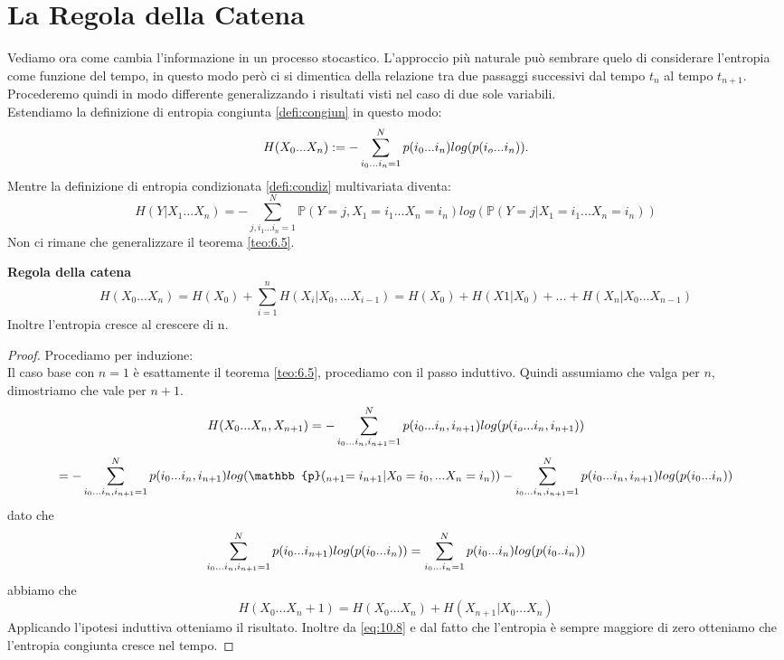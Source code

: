 \section{La Regola della Catena}
\label{sec:chainRule}
Vediamo ora come cambia l'informazione in un processo stocastico. L'approccio più naturale può sembrare quelo di considerare l'entropia come funzione del tempo, in questo modo però ci si dimentica della relazione tra due passaggi successivi dal tempo $t_n$ al tempo $t_{n+1}$. Procederemo quindi in modo differente generalizzando i risultati visti nel caso di due sole variabili.\\
 Estendiamo la definizione di entropia congiunta \ref{defi:congiun} in questo modo:
\begin{equation}
H(X_0...X_n):=- \sum_{i_0...i_n=1}^N p(i_0...i_n)log(p(i_o...i_n)).
\end{equation}
Mentre la definizione di entropia condizionata \ref{defi:condiz} multivariata diventa:
\begin{equation}
H(Y|X_1...X_n)=-\sum_{j,i_1...i_n=1}^N \mathbb{P}(Y=j,X_1=i_1...X_n=i_n) log(\mathbb{P}(Y=j|X_1=i_1...X_n=i_n))
\end{equation}
Non ci rimane che generalizzare il teorema \ref{teo:6.5}.
\begin{teo} \label{teo:chainRule}
\textbf{Regola della catena}
\begin{equation}
H(X_0...X_n)=H(X_0)+\sum_{i=1}^n  H(X_i|X_0,...X_{i-1})=H(X_0)+H(X1|X_0)+...+H(X_n|X_0...X_{n-1})
\end{equation}
Inoltre l'entropia cresce al crescere di n.
\end{teo}
\begin{proof}
Procediamo per induzione:\\
Il caso base con $n=1$ è esattamente il teorema \ref{teo:6.5}, procediamo con il passo induttivo. Quindi assumiamo che valga per $n$, dimostriamo che vale per $n+1$.
$$H(X_0...X_n, X_{n+1})=- \sum_{i_0...i_n,i_{n+1}=1}^N p(i_0...i_n,i_{n+1})log(p(i_o...i_n,i_{n+1}))$$
$$= - \sumaa p(i_0...i_n,i_{n+1})log(\mathbb{p}(_{n+1}=i_{n+1}|X_0=i_0,...X_n=i_n))-\sumaa p(i_0...i_n,i_{n+1})log(p(i_0...i_n))$$
dato che 
$$\sum_{i_0...i_n,i_{n+1}=1}^N p(i_0...i_{n+1})log(p(i_0...i_n))=\sum_{i_0...i_n=1}^N p(i_0...i_{n})log(p(i_0..i_n))$$
abbiamo che
\begin{equation}\label{eq:10.8}
H(X_0...X_n+1)=H(X_0...X_n)+H(X_{n+1}|X_0...X_n)
\end{equation}
Applicando l'ipotesi induttiva otteniamo il risultato.
Inoltre da \ref{eq:10.8} e dal fatto che l'entropia è sempre maggiore di zero otteniamo che l'entropia congiunta cresce nel tempo.
\end{proof}


